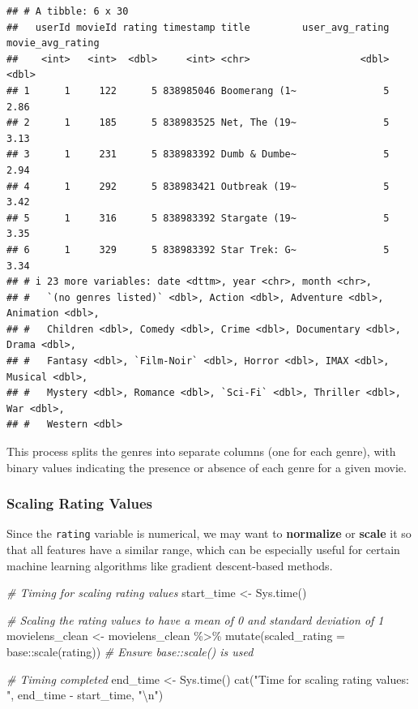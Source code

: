 \documentclass[
]{article}
\newenvironment{Shaded}{}{}
\newcommand{\AttributeTok}[1]{\textcolor[rgb]{0.49,0.56,0.16}{#1}}
\newcommand{\CommentTok}[1]{\textcolor[rgb]{0.38,0.63,0.69}{\textit{#1}}}
\newcommand{\FunctionTok}[1]{\textcolor[rgb]{0.02,0.16,0.49}{#1}}
\newcommand{\NormalTok}[1]{#1}
\newcommand{\OtherTok}[1]{\textcolor[rgb]{0.00,0.44,0.13}{#1}}
\newcommand{\SpecialCharTok}[1]{\textcolor[rgb]{0.25,0.44,0.63}{#1}}
\newcommand{\StringTok}[1]{\textcolor[rgb]{0.25,0.44,0.63}{#1}}
\begin{document}
\begin{verbatim}
## # A tibble: 6 x 30
##   userId movieId rating timestamp title         user_avg_rating movie_avg_rating
##    <int>   <int>  <dbl>     <int> <chr>                   <dbl>            <dbl>
## 1      1     122      5 838985046 Boomerang (1~               5             2.86
## 2      1     185      5 838983525 Net, The (19~               5             3.13
## 3      1     231      5 838983392 Dumb & Dumbe~               5             2.94
## 4      1     292      5 838983421 Outbreak (19~               5             3.42
## 5      1     316      5 838983392 Stargate (19~               5             3.35
## 6      1     329      5 838983392 Star Trek: G~               5             3.34
## # i 23 more variables: date <dttm>, year <chr>, month <chr>,
## #   `(no genres listed)` <dbl>, Action <dbl>, Adventure <dbl>, Animation <dbl>,
## #   Children <dbl>, Comedy <dbl>, Crime <dbl>, Documentary <dbl>, Drama <dbl>,
## #   Fantasy <dbl>, `Film-Noir` <dbl>, Horror <dbl>, IMAX <dbl>, Musical <dbl>,
## #   Mystery <dbl>, Romance <dbl>, `Sci-Fi` <dbl>, Thriller <dbl>, War <dbl>,
## #   Western <dbl>
\end{verbatim}

This process splits the genres into separate columns (one for each
genre), with binary values indicating the presence or absence of each
genre for a given movie.

\subsubsection{Scaling Rating Values}\label{scaling-rating-values}

Since the \texttt{rating} variable is numerical, we may want to
\textbf{normalize} or \textbf{scale} it so that all features have a
similar range, which can be especially useful for certain machine
learning algorithms like gradient descent-based methods.

\begin{Shaded}
\begin{Highlighting}[]
\CommentTok{\# Timing for scaling rating values}
\NormalTok{start\_time }\OtherTok{\textless{}{-}} \FunctionTok{Sys.time}\NormalTok{()}

\CommentTok{\# Scaling the rating values to have a mean of 0 and standard deviation of 1}
\NormalTok{movielens\_clean }\OtherTok{\textless{}{-}}\NormalTok{ movielens\_clean }\SpecialCharTok{\%\textgreater{}\%}
  \FunctionTok{mutate}\NormalTok{(}\AttributeTok{scaled\_rating =}\NormalTok{ base}\SpecialCharTok{::}\FunctionTok{scale}\NormalTok{(rating))  }\CommentTok{\# Ensure base::scale() is used}

\CommentTok{\# Timing completed}
\NormalTok{end\_time }\OtherTok{\textless{}{-}} \FunctionTok{Sys.time}\NormalTok{()}
\FunctionTok{cat}\NormalTok{(}\StringTok{"Time for scaling rating values: "}\NormalTok{, end\_time }\SpecialCharTok{{-}}\NormalTok{ start\_time, }\StringTok{"}\SpecialCharTok{\textbackslash{}n}\StringTok{"}\NormalTok{)}
\end{Highlighting}
\end{Shaded}
\end{document}
